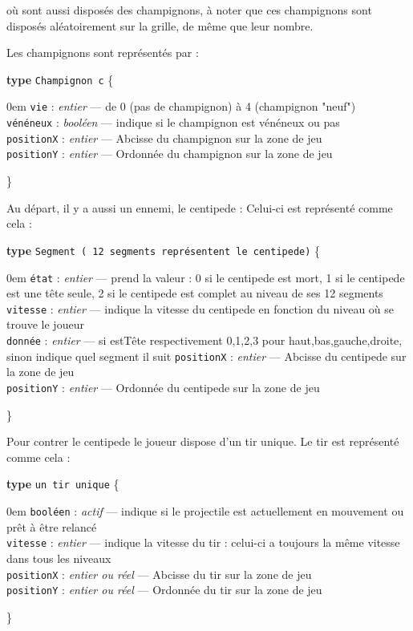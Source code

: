 \documentclass[a4paper, 12pt, twoside]{article}
\newenvironment{typeag}[1][]{\noindent \textbf{type} \texttt{#1} \{\begin{addmargin}[2em]{0em}}{\end{addmargin}\}}
\newcommand{\variable}[3]{\noindent \texttt{#1} : \textit{#2} --- #3}
\begin{document}
où  sont aussi disposés des champignons, à noter que ces champignons sont disposés aléatoirement sur la grille, de même que leur nombre. 

Les champignons sont représentés par :

\begin{typeag}[Champignon c]
        \variable{vie}{entier}{de 0 (pas de champignon) à 4 (champignon "neuf")}\\
        \variable{vénéneux}{booléen}{indique si le champignon est vénéneux ou pas}\\
        \variable{positionX}{entier}{Abcisse du champignon sur la zone de jeu}\\
        \variable{positionY}{entier}{Ordonnée du champignon sur la zone de jeu}
\end{typeag}

Au départ, il y a aussi un ennemi, le centipede : 
Celui-ci est représenté comme cela : 

\begin{typeag}[Segment ( 12 segments représentent le centipede)]
        \variable{état}{entier}{prend la valeur : 0 si le centipede est mort, 1 si le centipede est une tête seule, 2 si le centipede est complet au niveau de ses 12 segments}\\
        \variable{vitesse}{entier}{indique la vitesse du centipede en fonction du niveau où se trouve le joueur}\\
        \variable{donnée}{entier}{si estTête respectivement 0,1,2,3 pour haut,bas,gauche,droite, sinon indique quel segment il suit}
        \variable{positionX}{entier}{Abcisse du centipede sur la zone de jeu}\\
        \variable{positionY}{entier}{Ordonnée du centipede sur la zone de jeu}
\end{typeag}

Pour contrer le centipede le joueur dispose d'un tir unique.
Le tir est représenté comme cela : 

\begin{typeag}[un tir unique]
        \variable{booléen}{actif}{indique si le projectile est actuellement en mouvement ou prêt à être relancé}\\
        \variable{vitesse}{entier}{indique la vitesse du tir : celui-ci a toujours la même vitesse dans tous les niveaux}\\
        \variable{positionX}{entier ou réel}{Abcisse du tir sur la zone de jeu}\\
        \variable{positionY}{entier ou réel}{Ordonnée du tir sur la zone de jeu}
\end{typeag}
\end{document}

